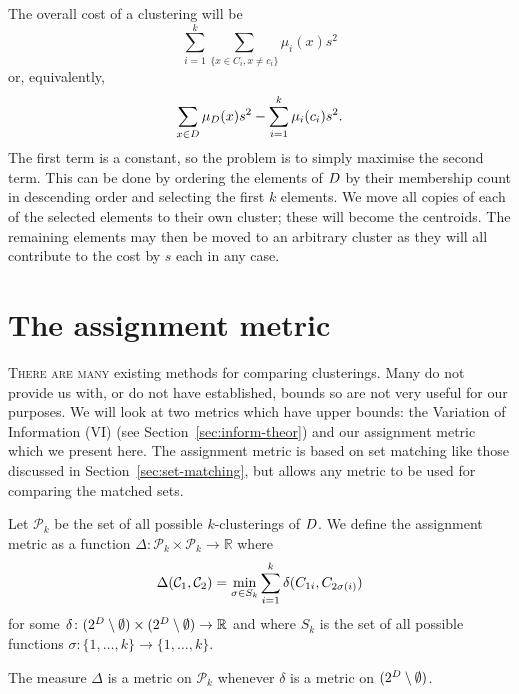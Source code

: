 The overall cost of a clustering will be
\begin{equation*}
  \sum_{i=1}^{k} \sum_{\{x \in C_i,x \neq c_i\}} \mu_{i}(x)s^2
\end{equation*}
or, equivalently,
\begin{equation*}
  \sum_{x \in D} \mu_{D}(x)s^2 - \sum_{i=1}^{k} \mu_{i}(c_i)s^2.
\end{equation*}
The first term is a constant, so the problem is to simply maximise the second
term.  This can be done by ordering the elements of $D$ by their
membership count in descending order and selecting the first $k$ elements.  We
move all copies of each of the selected elements to their own cluster; these
will become the centroids.  The remaining elements may then be moved to an
arbitrary cluster as they will all contribute to the cost by $s$ each in any
case.

\section{The assignment metric}
\label{sec:metr-comp-clust}

\textsc{There are many} existing methods for comparing clusterings.  Many do
not provide us with, or do not have established, bounds so are not very useful
for our purposes.  We will look at two metrics which have upper bounds: the
Variation of Information (VI) (see Section~\ref{sec:inform-theor}) and our
assignment metric which we present here.  The assignment metric is based on
set matching like those discussed in Section~\ref{sec:set-matching}, but
allows any metric to be used for comparing the matched sets.

Let $\mathcal{P}_k$ be the set of all possible $k$-clusterings of $D$.
We define the assignment metric as a function $\Delta \colon \mathcal{P}_k
\!\times \mathcal{P}_k \to \mathbb{R}$ where
\begin{equation*}
  \Delta(\mathcal{C}_1, \mathcal{C}_2) = \min_{\sigma \in S_k} \sum_{i=1}^{k}
  \delta(C_{1i}, C_{2\sigma(i)})
\end{equation*}
for some $\delta \colon (2^{D} \setminus \emptyset) \times (2^{D}
\setminus \emptyset) \to \mathbb{R}$ and where $S_k$ is the set of all
possible functions $\sigma \colon \{1, \dotsc, k\} \to \{1, \dotsc, k\}$.

\begin{thm}
  The measure $\Delta$ is a metric on $\mathcal{P}_k$ whenever $\delta$ is a
  metric on $(2^{D} \setminus \emptyset)$.
\end{thm}

